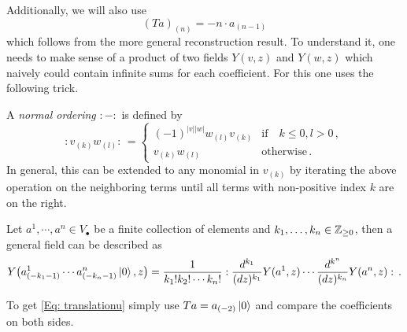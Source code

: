 \documentclass[a4paper, 12pt]{amsart}
\begin{document}
Additionally, we will also use 
\begin{equation}
\label{Eq: translationu}
(Ta)_{(n)} = -n\cdot a_{(n-1)}
\end{equation}
which follows from the more general reconstruction result.
To understand it, one needs to make sense of a product of two fields $Y(v,z)$ and $Y(w,z)$ which naively could contain infinite sums for each coefficient. For this one uses the following trick.
\begin{definition}[{\cite[(2.3.5)]{Ka98}}]
 A \textit{normal ordering} $:-:$ is defined by 
$$
:v_{(k)} w_{(l)}: \,=\begin{cases}(-1)^{|v||w|}w_{(l)}v_{(k)}&\text{if} \quad k\leq 0,l>0\,,\\
v_{(k)}w_{(l)}& \text{otherwise}\,.\end{cases}
$$
In general, this can be extended to any monomial in $v_{(k)}$ by iterating the above operation on the neighboring terms until all terms with non-positive index $k$ are on the right. 
\end{definition}


\begin{theorem}[{\cite[Corollary 4.5]{Ka98}}]
    Let $a^1,\cdots, a^n\in V_{\bullet}$ be a finite collection of elements and $k_1,\dots,k_n\in {\mathbb{Z}}_{\geq 0}$, then a general field can be described as
    $$
    Y\big(a^1_{(-k_1-1)}\cdots a^n_{(-k_n-1)}\ket{0},z\big)
= \frac{1}{k_1!k_2!\cdots k_n !}:\frac{d^{k_1}}{(dz)^{k_1}}Y(a^1,z)\cdots \frac{d^{k^n}}{(dz)^{k_n}}Y(a^n,z):\,.
    $$
\end{theorem}
To get \eqref{Eq: translationu} simply use $Ta = a_{(-2)}\ket{0}$ and compare the coefficients on both sides.
\end{document}
